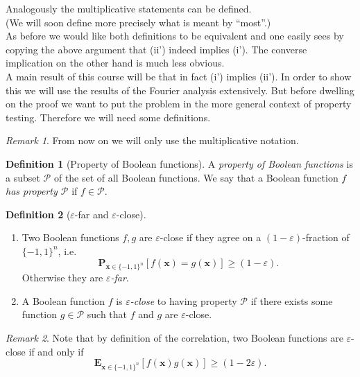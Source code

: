 \documentclass[a4paper]{article}
\newcommand{\prob}{\mathbf{P}}
\newcommand{\expe}{\mathbf{E}}
\newcommand{\prty}{\mathcal{P}}
\newcommand{\eps}{\varepsilon}
\newcommand{\boldx}{\boldsymbol{x}}
\theoremstyle{plain}
\theoremstyle{definition}
\newtheorem{definition}{Definition}
\theoremstyle{remark}
\newtheorem*{remark*}{Remark}
\begin{document}
\noindent Analogously the multiplicative statements can be defined. \\ 

\noindent (We will soon define more precisely what is meant by ``most''.)\\

\noindent As before we would like both definitions to be equivalent
and one easily sees by copying the above argument that (ii') indeed
implies (i'). The converse implication on the other hand is much less
obvious. \\

\noindent A main result of this course will be that in fact (i') implies
(ii'). In order to show this we will use the results of the Fourier
analysis extensively. But before dwelling on the proof we want to put
the problem in the more general context of property testing. Therefore
we will need some definitions. 

\begin{remark*}
  From now on we will only use the multiplicative notation. 
\end{remark*}

\begin{definition}[Property of Boolean functions] \label{def:2}
  A \emph{property of Boolean functions} is a subset \(\prty\) of the
  set of all Boolean functions. We say that a Boolean function \(f\) \emph{has property \(\prty\)} if \(f
  \in \prty\). 
\end{definition}

\begin{definition}[\(\eps\)-far and \(\eps\)-close] \label{def:3}
  \begin{enumerate}[label=(\roman*)]
  \item Two Boolean functions \(f,g\) are \(\eps\)-close if they agree
    on a \((1-\eps)\)-fraction of \(\{-1,1\}^n\), i.e. 
    \[\prob_{\boldx\in\{-1,1\}^n}\left[f(\boldx) = g(\boldx)\right] \geq (1-\eps).\]
    Otherwise they are \emph{\(\eps\)-far}. 
  \item A Boolean function \(f\) is \emph{\(\eps\)-close} to having property
    \(\prty\) if there exists some function \(g\in \prty\) such that
    \(f\) and \(g\) are \(\eps\)-close. 
  \end{enumerate}
\end{definition}

\begin{remark*}
  Note that by definition of the correlation, two Boolean functions
  are \(\eps\)-close if and only if 
  \[\expe_{\boldx \in \{-1,1\}^n}\left[f(\boldx)g(\boldx)\right] \geq
  (1- 2\eps).\]  
\end{remark*}
\end{document}

